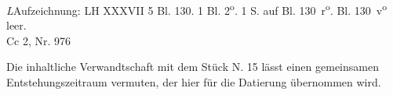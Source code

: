 \begin{Ueberlieferung}%
{\textit{L}}Aufzeichnung: LH XXXVII 5 Bl. 130. 1 Bl. 2\textsuperscript{o}. 1 S. auf Bl. 130~r\textsuperscript{o}. Bl. 130~v\textsuperscript{o} leer.\\%
Cc 2, Nr. 976
\end{Ueberlieferung}%
%
\begin{Datierungsgruende}%
Die inhaltliche Verwandtschaft mit dem Stück N. 15 
lässt einen gemeinsamen Entstehungszeitraum vermuten, der hier für die Datierung übernommen wird.
\end{Datierungsgruende}
%
\count{}
\count{}
\count{}
